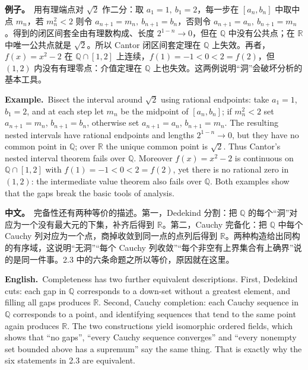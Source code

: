 \documentclass[UTF8,11pt,a4paper]{ctexart}
\newcommand{\BOTH}[2]{\par\noindent\textbf{中文。}\ #1\par\noindent\textbf{English.}\ #2\par}
\newcommand{\EX}[2]{\par\noindent\textbf{例子。}\ #1\par\noindent\textbf{Example.}\ #2\par}
\begin{document}
\EX{用有理端点对 $\sqrt2$ 作二分：取 $a_1=1,\ b_1=2$，每一步在 $[a_n,b_n]$ 中取中点 $m_n$，若 $m_n^2<2$ 则令 $a_{n+1}=m_n,\ b_{n+1}=b_n$，否则令 $a_{n+1}=a_n,\ b_{n+1}=m_n$。得到的闭区间套全由有理数构成、长度 $2^{1-n}\to0$，但在 $\mathbb Q$ 中没有公共点；在 $\mathbb R$ 中唯一公共点就是 $\sqrt2$。所以 Cantor 闭区间套定理在 $\mathbb Q$ 上失效。再者，$f(x)=x^2-2$ 在 $\mathbb Q\cap[1,2]$ 上连续，$f(1)=-1<0<2=f(2)$，但 $(1,2)$ 内没有有理零点：介值定理在 $\mathbb Q$ 上也失效。这两例说明“洞”会破坏分析的基本工具。}{Bisect the interval around $\sqrt2$ using rational endpoints: take $a_1=1$, $b_1=2$, and at each step let $m_n$ be the midpoint of $[a_n,b_n]$; if $m_n^2<2$ set $a_{n+1}=m_n$, $b_{n+1}=b_n$, otherwise set $a_{n+1}=a_n$, $b_{n+1}=m_n$. The resulting nested intervals have rational endpoints and lengths $2^{1-n}\to0$, but they have no common point in $\mathbb Q$; over $\mathbb R$ the unique common point is $\sqrt2$. Thus Cantor's nested interval theorem fails over $\mathbb Q$. Moreover $f(x)=x^2-2$ is continuous on $\mathbb Q\cap[1,2]$ with $f(1)=-1<0<2=f(2)$, yet there is no rational zero in $(1,2)$: the intermediate value theorem also fails over $\mathbb Q$. Both examples show that the gaps break the basic tools of analysis.}
\BOTH{完备性还有两种等价的描述。第一，Dedekind 分割：把 $\mathbb Q$ 的每个“洞”对应为一个没有最大元的下集，补齐后得到 $\mathbb R$。第二，Cauchy 完备化：把 $\mathbb Q$ 中每个 Cauchy 列对应为一个点，商掉收敛到同一点的点列后得到 $\mathbb R$。两种构造给出同构的有序域，这说明“无洞”“每个 Cauchy 列收敛”“每个非空有上界集合有上确界”说的是同一件事。2.3 中的六条命题之所以等价，原因就在这里。}{Completeness has two further equivalent descriptions. First, Dedekind cuts: each gap in $\mathbb Q$ corresponds to a down-set without a greatest element, and filling all gaps produces $\mathbb R$. Second, Cauchy completion: each Cauchy sequence in $\mathbb Q$ corresponds to a point, and identifying sequences that tend to the same point again produces $\mathbb R$. The two constructions yield isomorphic ordered fields, which shows that “no gaps”, “every Cauchy sequence converges” and “every nonempty set bounded above has a supremum” say the same thing. That is exactly why the six statements in 2.3 are equivalent.}
\end{document}
